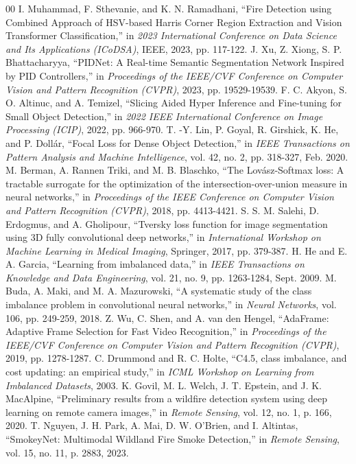 \documentclass[conference]{IEEEtran}
\begin{document}
\begin{thebibliography}{00}
 I. Muhammad, F. Sthevanie, and K. N. Ramadhani, ``Fire Detection using Combined Approach of HSV-based Harris Corner Region Extraction and Vision Transformer Classification,'' in \textit{2023 International Conference on Data Science and Its Applications (ICoDSA)}, IEEE, 2023, pp. 117-122.
 J. Xu, Z. Xiong, S. P. Bhattacharyya, ``PIDNet: A Real-time Semantic Segmentation Network Inspired by PID Controllers,'' in \textit{Proceedings of the IEEE/CVF Conference on Computer Vision and Pattern Recognition (CVPR)}, 2023, pp. 19529-19539.
 F. C. Akyon, S. O. Altinuc, and A. Temizel, ``Slicing Aided Hyper Inference and Fine-tuning for Small Object Detection,'' in \textit{2022 IEEE International Conference on Image Processing (ICIP)}, 2022, pp. 966-970.
 T. -Y. Lin, P. Goyal, R. Girshick, K. He, and P. Dollár, ``Focal Loss for Dense Object Detection,'' in \textit{IEEE Transactions on Pattern Analysis and Machine Intelligence}, vol. 42, no. 2, pp. 318-327, Feb. 2020.
 M. Berman, A. Rannen Triki, and M. B. Blaschko, ``The Lovász-Softmax loss: A tractable surrogate for the optimization of the intersection-over-union measure in neural networks,'' in \textit{Proceedings of the IEEE Conference on Computer Vision and Pattern Recognition (CVPR)}, 2018, pp. 4413-4421.
 S. S. M. Salehi, D. Erdogmus, and A. Gholipour, ``Tversky loss function for image segmentation using 3D fully convolutional deep networks,'' in \textit{International Workshop on Machine Learning in Medical Imaging}, Springer, 2017, pp. 379-387.
 H. He and E. A. Garcia, ``Learning from imbalanced data,'' in \textit{IEEE Transactions on Knowledge and Data Engineering}, vol. 21, no. 9, pp. 1263-1284, Sept. 2009.
 M. Buda, A. Maki, and M. A. Mazurowski, ``A systematic study of the class imbalance problem in convolutional neural networks,'' in \textit{Neural Networks}, vol. 106, pp. 249-259, 2018.
 Z. Wu, C. Shen, and A. van den Hengel, ``AdaFrame: Adaptive Frame Selection for Fast Video Recognition,'' in \textit{Proceedings of the IEEE/CVF Conference on Computer Vision and Pattern Recognition (CVPR)}, 2019, pp. 1278-1287.
 C. Drummond and R. C. Holte, ``C4.5, class imbalance, and cost updating: an empirical study,'' in \textit{ICML Workshop on Learning from Imbalanced Datasets}, 2003.
 K. Govil, M. L. Welch, J. T. Epstein, and J. K. MacAlpine, ``Preliminary results from a wildfire detection system using deep learning on remote camera images,'' in \textit{Remote Sensing}, vol. 12, no. 1, p. 166, 2020.
 T. Nguyen, J. H. Park, A. Mai, D. W. O'Brien, and I. Altintas, ``SmokeyNet: Multimodal Wildland Fire Smoke Detection,'' in \textit{Remote Sensing}, vol. 15, no. 11, p. 2883, 2023.
\end{thebibliography}
\end{document}
